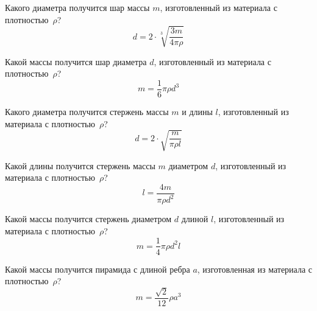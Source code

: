 \bigskip


\begin{zztask} 
Какого диаметра получится шар массы $m$, изготовленный из материала с
плотностью~$\rho$?
%
\[
d = 2\cdot \sqrt[3]{\frac{3m}{4\pi\rho}}
\]
\end{zztask}


\begin{zztask}
Какой массы получится шар диаметра $d$, изготовленный из материала с
плотностью~$\rho$?
%
\[
m = \frac{1}{6}\pi\rho d^3
\]
\end{zztask}


\begin{zztask}
Какого диаметра получится стержень массы $m$ и длины $l$, изготовленный из
материала с плотностью~$\rho$?
%
\[
d = 2\cdot \sqrt{\frac{m}{\pi\rho l}}
\]
\end{zztask}


\begin{zztask}
Какой длины получится стержень массы $m$ диаметром $d$, изготовленный из
материала с плотностью~$\rho$?
%
\[
l = \frac{4m}{\pi\rho d^2}
\]
\end{zztask}


\begin{zztask}
Какой массы получится стержень диаметром $d$ длиной $l$, изготовленный из
материала с плотностью~$\rho$?
%
\[
m = \frac{1}{4}\pi\rho d^2 l
\]
\end{zztask}


\begin{zztask}
Какой массы получится пирамида с длиной ребра $a$, изготовленная из
материала с плотностью~$\rho$?
%
\[
m = \frac{\sqrt2}{12}\rho a^3
\]
\end{zztask}


